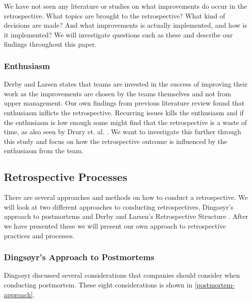 We have not seen any literature or studies on what improvements do occur in the retrospective. What topics are brought to the retrospective? What kind of decisions are made? And what improvements is actually implemented, and how is it implemented? We will investigate questions such as these and describe our findings throughout this paper.

\subsubsection{Enthusiasm}
Derby and Larsen \cite{Larsen2006} states that teams are invested in the success of improving their work as the improvements are chosen by the teams themselves and not from upper management. Our own findings \cite{Dolvik2014} from previous literature review found that enthusiasm inflicts the retrospective. Recurring issues kills the enthusiasm and if the enthusiasm is low enough some might find that the retrospective is a waste of time, as also seen by Drury et. al. \cite{Drury2012}. We want to investigate this further through this study and focus on how the retrospective outcome is influenced by the enthusiasm from the team. 

\subsection{Retrospective Processes}
There are several approaches and methods on how to conduct a retrospective. We will look at two different approaches to conducting retrospectives, Dingsøyr's \cite{Dingsoyr2004} approach to postmortems and Derby and Larsen's Retrospective Structure \cite{Larsen2006}. After we have presented these we will present our own approach to retrospective practices and processes. 


\subsubsection{Dingsøyr's Approach to Postmortems}
Dingsøyr \cite{Dingsoyr2004} discussed several considerations that companies should consider when conducting postmortem. These eight considerations is shown in \autoref{postmortem-approach}. 

